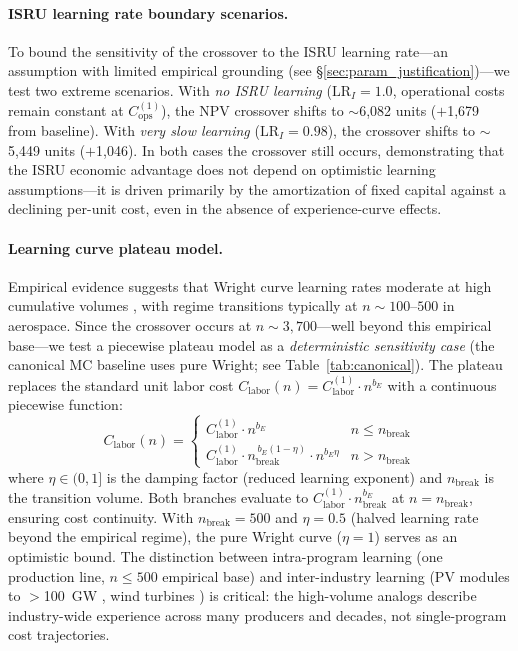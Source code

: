 \documentclass[preprint,12pt]{elsarticle}
\begin{document}
\paragraph{ISRU learning rate boundary scenarios.} To bound the sensitivity of the crossover to the ISRU learning rate---an assumption with limited empirical grounding (see \S\ref{sec:param_justification})---we test two extreme scenarios. With \emph{no ISRU learning} ($\mathrm{LR}_I = 1.0$, operational costs remain constant at $C_{\mathrm{ops}}^{(1)}$), the NPV crossover shifts to $\sim$6{,}082 units ($+$1{,}679 from baseline). With \emph{very slow learning} ($\mathrm{LR}_I = 0.98$), the crossover shifts to $\sim$5{,}449 units ($+$1{,}046). In both cases the crossover still occurs, demonstrating that the ISRU economic advantage does not depend on optimistic learning assumptions---it is driven primarily by the amortization of fixed capital against a declining per-unit cost, even in the absence of experience-curve effects.

\paragraph{Learning curve plateau model.} Empirical evidence suggests that Wright curve learning rates moderate at high cumulative volumes \cite{argote1990,thompson2012,benkard2000}, with regime transitions typically at $n \sim 100$--$500$ in aerospace. Since the crossover occurs at $n \sim 3{,}700$---well beyond this empirical base---we test a piecewise plateau model as a \emph{deterministic sensitivity case} (the canonical MC baseline uses pure Wright; see Table~\ref{tab:canonical}). The plateau replaces the standard unit labor cost $C_{\mathrm{labor}}(n) = C_{\mathrm{labor}}^{(1)} \cdot n^{b_E}$ with a continuous piecewise function:
\begin{equation}
  C_{\mathrm{labor}}(n) = \begin{cases}
    C_{\mathrm{labor}}^{(1)} \cdot n^{b_E} & n \leq n_{\mathrm{break}} \\[4pt]
    C_{\mathrm{labor}}^{(1)} \cdot n_{\mathrm{break}}^{\,b_E(1-\eta)} \cdot n^{b_E \eta} & n > n_{\mathrm{break}}
  \end{cases}
\end{equation}
where $\eta \in (0,1]$ is the damping factor (reduced learning exponent) and $n_{\mathrm{break}}$ is the transition volume. Both branches evaluate to $C_{\mathrm{labor}}^{(1)} \cdot n_{\mathrm{break}}^{b_E}$ at $n = n_{\mathrm{break}}$, ensuring cost continuity. With $n_{\mathrm{break}} = 500$ and $\eta = 0.5$ (halved learning rate beyond the empirical regime), the pure Wright curve ($\eta = 1$) serves as an optimistic bound. The distinction between intra-program learning (one production line, $n \leq 500$ empirical base) and inter-industry learning (PV modules to $>$100~GW \cite{kavlak2018}, wind turbines \cite{rubin2015}) is critical: the high-volume analogs describe industry-wide experience across many producers and decades, not single-program cost trajectories.
\end{document}
